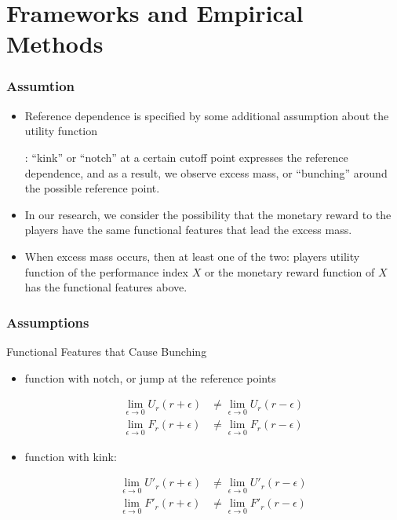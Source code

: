 \documentclass[dvipdfmx,12pt]{beamer}
\begin{document}
\section{Frameworks and Empirical Methods}

\begin{frame}\frametitle{Assumtion}
  \begin{itemize}
    \item Reference dependence is specified by some additional assumption about the utility function

    : ``kink'' or ``notch'' at a certain cutoff point expresses the reference dependence, and as a result, we observe excess mass, or ``bunching'' around the possible reference point.

    \item In our research, we consider the possibility that the monetary reward to the players have the same functional features that lead the excess mass.

    \item When excess mass occurs, then at least one of the two: players utility function of the performance index $X$ or the monetary reward function of $X$ has the functional features above.

  \end{itemize}
\end{frame}

\begin{frame}\frametitle{Assumptions}
  \begin{block}{Functional Features that Cause Bunching}
    \begin{itemize}
      \footnotesize
      \item function with notch, or jump at the reference points

      \begin{align*}
        \lim_{\epsilon \to 0} U_r (r + \epsilon) & \neq
        \lim_{\epsilon \to 0} U_r (r - \epsilon) \\
        \lim_{\epsilon \to 0} F_r (r + \epsilon) & \neq
        \lim_{\epsilon \to 0} F_r (r - \epsilon)
      \end{align*}

      \item function with kink:

      \begin{align*}
        \lim_{\epsilon \to 0} U'_r (r + \epsilon) & \neq
        \lim_{\epsilon \to 0} U'_r (r - \epsilon) \\
        \lim_{\epsilon \to 0} F'_r (r + \epsilon) & \neq
        \lim_{\epsilon \to 0} F'_r (r - \epsilon)
      \end{align*}
    \end{itemize}
  \end{block}
\end{frame}
\end{document}

